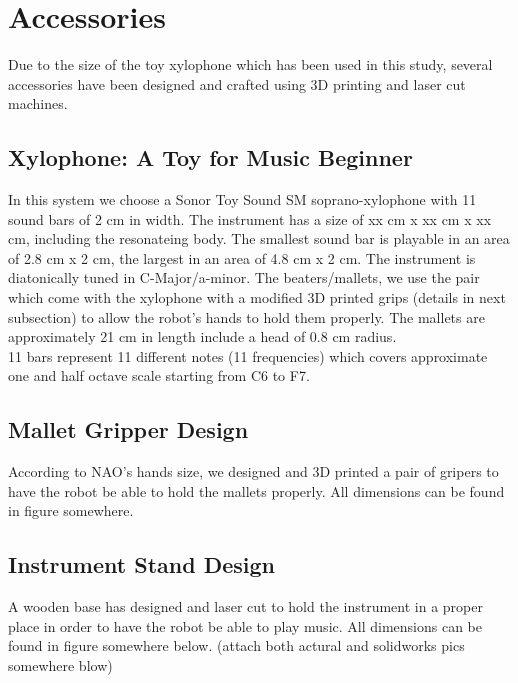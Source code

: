 \section{Accessories}
Due to the size of the toy xylophone which has been used in this study, several 
accessories have been designed and crafted using 3D printing and laser cut 
machines.\\

\subsection{Xylophone: A Toy for Music Beginner}

In this system we choose a Sonor Toy Sound SM soprano-xylophone with 11 sound 
bars of 2 cm in width. The instrument has a size of xx cm x xx cm x xx cm, 
including the resonateing body. The smallest sound bar is playable in an area of 
2.8 cm x 2 cm, the largest in an area of 4.8 cm x 2 cm. The instrument is 
diatonically tuned in C-Major/a-minor. The beaters/mallets, we use the pair which 
come with the xylophone with a modified 3D printed grips (details in next 
subsection) to allow the robot's hands to hold them properly. The mallets 
are approximately 21 cm in length include a head of 0.8 cm radius.\\ 

11 bars represent 11 different notes (11 frequencies) which covers 
approximate one and half octave scale starting from C6 to F7. \\

\subsection{Mallet Gripper Design}

According to NAO's hands size, we designed and 3D printed a pair of gripers to 
have the robot be able to hold the mallets properly. All dimensions can be found 
in figure somewhere.\\

\subsection{Instrument Stand Design}

A wooden base has designed and laser cut to hold the instrument in a proper place 
in order to have the robot be able to play music. All dimensions can be found in 
figure somewhere below. (attach both actural and solidworks pics somewhere blow)\\

